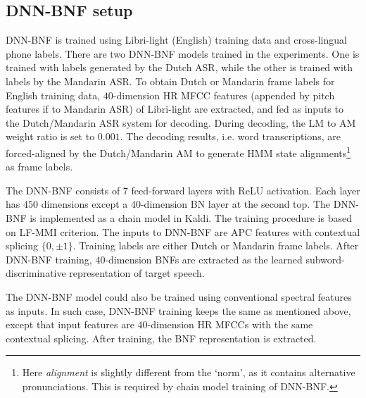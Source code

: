 \documentclass[a4paper]{article}
\begin{document}
\subsection{DNN-BNF setup}
DNN-BNF is trained using Libri-light (English) training data and cross-lingual phone labels. 
There are two DNN-BNF models trained in the experiments. One is trained with labels generated by the Dutch ASR, while the other is trained with labels by the Mandarin ASR. To obtain Dutch or Mandarin frame labels for English training data, $40$-dimension HR MFCC features (appended by pitch features if to Mandarin ASR) of Libri-light are extracted, and fed as inputs to the Dutch/Mandarin ASR system for decoding. 
During decoding, the LM to AM weight ratio is set to $0.001$.
The decoding results, i.e. word transcriptions,  are  forced-aligned by the Dutch/Mandarin AM to generate HMM state alignments\footnote{Here \textit{alignment} is slightly different from the `norm', as it contains alternative pronunciations. This is required by chain model training of DNN-BNF.} as frame labels.

The DNN-BNF consists of $7$ feed-forward layers with ReLU activation. Each layer has $450$ dimensions except a $40$-dimension BN layer at the second top. The DNN-BNF is implemented  as a chain model in Kaldi. The training procedure  is based on  LF-MMI criterion. 
The inputs to DNN-BNF are APC  features with contextual splicing $\{0,\pm 1\}$.
Training labels are either Dutch  or Mandarin frame labels. After DNN-BNF training, $40$-dimension BNFs are extracted as the learned subword-discriminative representation of target speech. 




The DNN-BNF model could also be trained using conventional spectral features as inputs. 
In such case, DNN-BNF training keeps the same as mentioned above, except that input features are $40$-dimension HR MFCCs with the same contextual splicing. After training, the BNF representation is   extracted.
\end{document}

